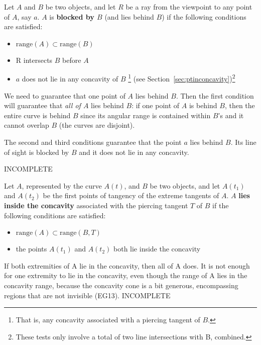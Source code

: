 \documentclass[12pt]{article}
\begin{document}
\begin{lemma}
Let $A$ and $B$ be two objects, and
let $R$ be a ray from the viewpoint to any point of $A$, say $a$.
$A$ is {\bf blocked by $B$} (and lies behind $B$)
if the following conditions are satisfied:
\begin{itemize}
\item $\mbox{range}(A) \subset \mbox{range}(B)$
\item R intersects $B$ before $A$
\item $a$ does not lie in any concavity of $B$ \footnote{That is, any concavity associated
      with a piercing tangent of $B$.}
      (see Section~\ref{sec:ptinconcavity})\footnote{These tests 
       only involve a total of two line intersections with B, combined.}
\end{itemize}
\end{lemma}
\prf
We need to guarantee that one point of $A$ lies behind $B$.
Then the first condition will guarantee that {\em all of $A$} lies behind $B$:
if one point of $A$ is behind $B$, then the entire curve is behind $B$
since its angular range is contained within $B$'s
and it cannot overlap $B$ (the curves are disjoint).

The second and third conditions guarantee that the point $a$ lies behind $B$.
Its line of sight is blocked by $B$ and it does not lie in any concavity.

INCOMPLETE
\QED

\begin{lemma}
Let $A$, represented by the curve $A(t)$, and $B$ be two objects, and
let $A(t_1)$ and $A(t_2)$ be the first points of tangency of the extreme
tangents of $A$.
$A$ {\bf lies inside the concavity} associated with the piercing tangent $T$ of $B$ 
if the following conditions are satisfied:
\begin{itemize}
\item $\mbox{range}(A) \subset \mbox{range}(B,T)$
\item the points $A(t_1)$ and $A(t_2)$ both lie inside the concavity
\end{itemize}
\end{lemma}
\prf
If both extremities of A lie in the concavity, then all of A does.
It is not enough for one extremity to lie in the concavity, even though
the range of A lies in the concavity range, because the concavity cone
is a bit generous, encompassing regions that are not invisible (EG13).
INCOMPLETE
\QED
\end{document}
